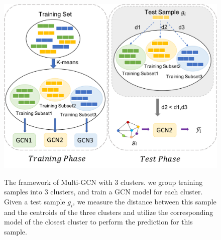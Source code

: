 \documentclass[11pt,dvipdfm]{article}
\begin{document}
\begin{figure}[!t]

\begin{center}

{\includegraphics[width=0.7\linewidth]{submissions/Yiqi2023/figs/mmodel.pdf}}

\end{center}
\caption{The framework of Multi-GCN with $3$ clusters. we group training samples into $3$ clusters, and train a GCN model for each cluster. Given a test sample $g_i$, we measure the distance between this sample and the centroids of the three clusters and utilize the corresponding model of the closest cluster to perform the prediction for this sample. }

\label{fig:mmodel-frame}
\end{figure}
\end{document}
